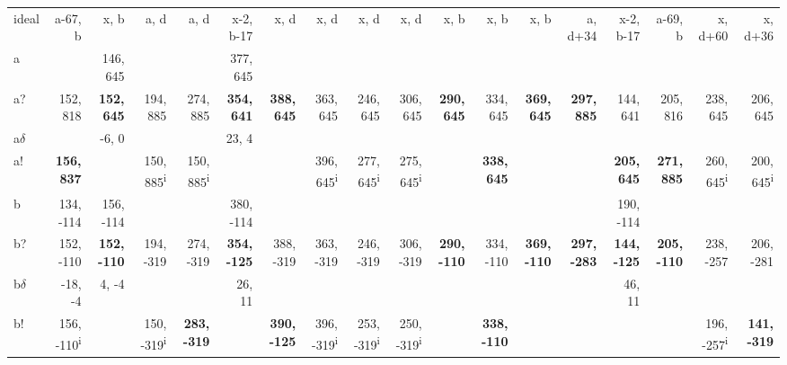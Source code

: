 \begin{table}[p]
{\begin{tabular}{lrrrrrrrrrrrrrrrrr}
ideal & a-67, b & x, b & a, d & a, d & x-2, b-17 & x, d & x, d & x, d & x, d & x, b & x, b & x, b & a, d+34 & x-2, b-17 & a-69, b & x, d+60 & x, d+36 \\
a &  & 146, 645 &  &  & 377, 645 &  &  &  &  &  &  &  &  &  &  &  &  \\
a? & 152, 818 & \textbf{152, 645} & 194, 885 & 274, 885 & \textbf{354, 641} & \textbf{388, 645} & 363, 645 & 246, 645 & 306, 645 & \textbf{290, 645} & 334, 645 & \textbf{369, 645} & \textbf{297, 885} & 144, 641 & 205, 816 & 238, 645 & 206, 645 \\
a$\delta$ &  & -6, 0 &  &  & 23, 4 &  &  &  &  &  &  &  &  &  &  &  &  \\
a! & \textbf{156, 837} &  & 150, 885\textsuperscript{i} & 150, 885\textsuperscript{i} &  &  & 396, 645\textsuperscript{i} & 277, 645\textsuperscript{i} & 275, 645\textsuperscript{i} &  & \textbf{338, 645} &  &  & \textbf{205, 645} & \textbf{271, 885} & 260, 645\textsuperscript{i} & 200, 645\textsuperscript{i} \\
b & 134, -114 & 156, -114 &  &  & 380, -114 &  &  &  &  &  &  &  &  & 190, -114 &  &  &  \\
b? & 152, -110 & \textbf{152, -110} & 194, -319 & 274, -319 & \textbf{354, -125} & 388, -319 & 363, -319 & 246, -319 & 306, -319 & \textbf{290, -110} & 334, -110 & \textbf{369, -110} & \textbf{297, -283} & \textbf{144, -125} & \textbf{205, -110} & 238, -257 & 206, -281 \\
b$\delta$ & -18, -4 & 4, -4 &  &  & 26, 11 &  &  &  &  &  &  &  &  & 46, 11 &  &  &  \\
b! & 156, -110\textsuperscript{i} &  & 150, -319\textsuperscript{i} & \textbf{283, -319} &  & \textbf{390, -125} & 396, -319\textsuperscript{i} & 253, -319\textsuperscript{i} & 250, -319\textsuperscript{i} &  & \textbf{338, -110} &  &  &  &  & 196, -257\textsuperscript{i} & \textbf{141, -319} \\

\end{tabular}}
\end{table}
